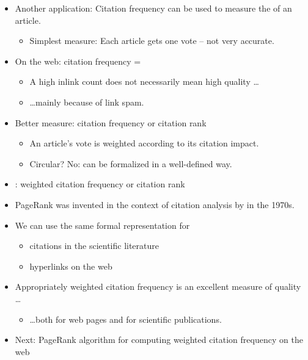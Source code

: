 \documentclass[a4paper,landscape,headrule,footrule,xetex]{foils}
\begin{document}
\begin{itemize}
\item Another application: Citation frequency can be used to measure
  the  of an article.
\begin{itemize}
\item Simplest measure: Each article gets one vote -- not
  very accurate.
\end{itemize}
\item On the web: citation frequency = 
\begin{itemize}
\item A high inlink count does not necessarily
  mean high quality \ldots
\item \ldots mainly because of link spam.
\end{itemize}
\item Better measure:  citation frequency or citation rank
\begin{itemize}
\item An article's vote is weighted according to its
  citation impact. 
\item Circular? No: can be formalized in a
  well-defined way.
\end{itemize}
\end{itemize}



\begin{itemize}
\item {}: weighted citation frequency or citation rank
\item PageRank was invented in the context of citation
  analysis by \citet{PINSKI1976297} in the 1970s.
\end{itemize}




\begin{itemize}
\item We can use the same formal representation for
\begin{itemize}
\item citations in the scientific literature
\item hyperlinks on the web
\end{itemize}
\item Appropriately weighted citation frequency is an
  excellent measure of  quality \ldots
\begin{itemize}
\item \ldots both for web pages and for scientific publications.
\end{itemize}
\item Next: PageRank algorithm for computing weighted
  citation frequency on the web
\end{itemize}
\end{document}
